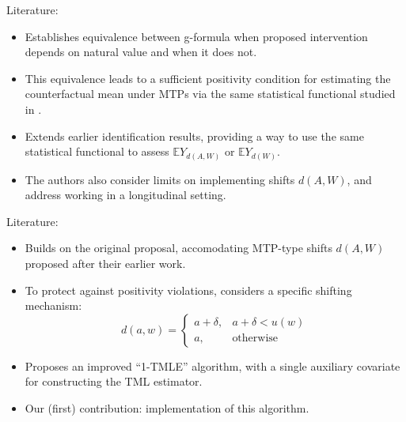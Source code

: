 \documentclass{beamer}
\newcommand{\E}{\mathbb{E}}
\begin{document}

\begin{frame}[c]{Literature: \cite{young2014identification}}

\begin{center}
\begin{itemize}
  \itemsep10pt
  \item Establishes equivalence between g-formula when proposed intervention
    depends on natural value and when it does not.
  \item This equivalence leads to a sufficient positivity condition for
    estimating the counterfactual mean under MTPs via the same statistical
    functional studied in \cite{diaz2012population}.
  \item Extends earlier identification results, providing a way to use the same
    statistical functional to assess $\E Y_{d(A,W)}$ or $\E Y_{d(W)}$.
  \item The authors also consider limits on implementing shifts $d(A,W)$, and
    address working in a longitudinal setting.
\end{itemize}
\end{center}

\note{
}

\end{frame}


\begin{frame}[c]{Literature: \cite{diaz2018stochastic}}

\begin{center}
\begin{itemize}
  \itemsep10pt
  \item Builds on the original proposal, accomodating MTP-type shifts $d(A,W)$
    proposed after their earlier work.
  \item To protect against positivity violations, considers a specific shifting
    mechanism:
     \begin{equation*}\label{shift_intervention}
       d(a, w) =
         \begin{cases}
           a + \delta, & a + \delta < u(w) \\
           a, & \text{otherwise}
         \end{cases}
     \end{equation*}
  \item Proposes an improved ``1-TMLE'' algorithm, with a single auxiliary
    covariate for constructing the TML estimator.
  \item Our (first) contribution: implementation of this algorithm.
\end{itemize}
\end{center}

\note{
}

\end{frame}
\end{document}
